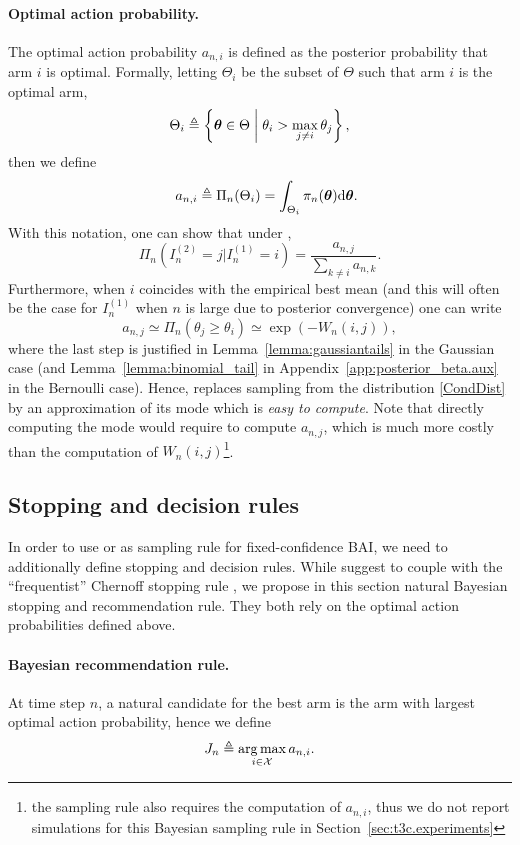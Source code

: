 \paragraph{Optimal action probability.} The optimal action probability $a_{n,i}$ is defined as the posterior probability that arm $i$ is optimal. Formally, letting $\Theta_i$ be the subset of $\Theta$ such that arm $i$ is the optimal arm,
\[
    \Theta_i \triangleq \left\{ {\boldsymbol \theta}\in\Theta \biggm| \theta_i > \max_{j\neq i}\theta_j \right\},
\]
then we define
\[
   \quad a_{n,i} \triangleq \Pi_{n}(\Theta_i) = \int_{\Theta_i} \pi_n({\boldsymbol \theta}) \text{d} {\boldsymbol \theta}.
\]
With this notation, one can show that under \TTTS, 
\begin{equation}\label{CondDist}
    \Pi_n\left(I_n^{(2)} =j | I_n^{(1)} = i\right) = \frac{a_{n,j}}{\sum_{k\neq i} a_{n,k}}.
\end{equation}
Furthermore, when $i$ coincides with the empirical best mean (and this will often be the case for $I_n^{(1)}$ when $n$ is large due to posterior convergence) one can write 
\[a_{n,j} \simeq \Pi_n\left(\theta_j \geq \theta_{i}\right) \simeq \exp\left(-W_n(i,j)\right),\]
where the last step is justified in Lemma~\ref{lemma:gaussiantails} in the Gaussian case (and Lemma~\ref{lemma:binomial_tail} in Appendix~\ref{app:posterior_beta.aux} in the Bernoulli case). Hence, \TCC replaces sampling from the distribution \eqref{CondDist} by an approximation of its mode which is \emph{easy to compute}. Note that directly computing the mode would require to compute $a_{n,j}$, which is much more costly than the computation of $W_{n}(i,j)$\footnote{the \TTPS sampling rule \citep{russo2016ttts} also requires the computation of $a_{n,i}$, thus we do not report simulations for this Bayesian sampling rule in Section~\ref{sec:t3c.experiments}}. 

\subsection{Stopping and decision rules}

In order to use \TTTS or \TCC as sampling rule for fixed-confidence BAI, we need to additionally define stopping and decision rules. While \cite{qin2017ttei} suggest to couple \TTEI with the ``frequentist'' Chernoff stopping rule \citep{garivier2016tracknstop}, we propose in this section natural Bayesian stopping and recommendation rule. They both rely on the optimal action probabilities defined above.

\paragraph{Bayesian recommendation rule.} 
At time step $n$, a natural candidate for the best arm is the arm with largest optimal action probability, hence we define 
\[
    J_n \triangleq \operatorname*{arg\,max}_{i\in\mathcal{X}} a_{n,i}.
\]

